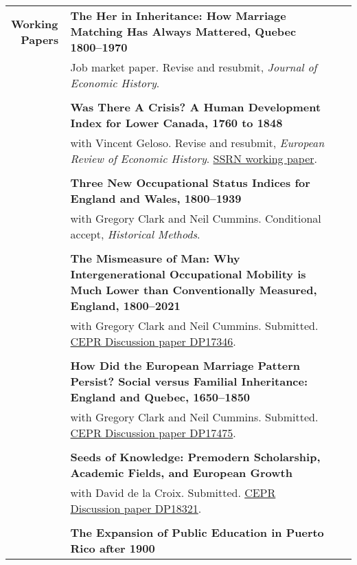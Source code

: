 \documentclass[a4paper,11pt,oneside]{article}
\begin{document}
\begin{longtable}{@{} p{0.175\linewidth} p{0.775\linewidth} p{0.05\linewidth}}
   \textbf{\large{Working \(\phantom{1}\)  Papers}}  & \textbf{The Her in Inheritance: How Marriage Matching Has Always Mattered, Quebec 1800--1970}\\ 
   &  Job market paper. Revise and resubmit, \emph{Journal of Economic History}. &  \\
   & &
   \\  
   &  \textbf{Was There A Crisis? A Human Development Index for Lower Canada, 1760 to 1848 } \\ 
   &   with Vincent Geloso. Revise and resubmit, \emph{European Review of Economic History}. \href{https://papers.ssrn.com/sol3/papers.cfm?abstract_id=4200516}{SSRN working paper}. &  \\
   \\
   & \textbf{Three New Occupational Status Indices for England and Wales, 1800--1939}\\ 
   &  with Gregory Clark and Neil Cummins. Conditional accept, \emph{Historical Methods}. &   \\
   \\
 
   & \textbf{The Mismeasure of Man: Why Intergenerational Occupational Mobility  is Much Lower than Conventionally Measured, England, 1800--2021}\\ 
   &  with Gregory Clark and Neil Cummins. Submitted. \href{https://hub.cepr.org/published-discussion-paper/139739}{CEPR Discussion paper DP17346}. &    \\
   & &
   \\  

   & \textbf{How Did the European Marriage Pattern Persist? Social versus Familial Inheritance: England and Quebec, 1650--1850 }\\ 
   &   with Gregory Clark and Neil Cummins. Submitted. \href{https://hub.cepr.org/published-discussion-paper/170950}{CEPR Discussion paper DP17475}. & \\
   \\
   & \textbf{Seeds of Knowledge: Premodern Scholarship, Academic Fields, and European Growth }\\ 
   &   with David de la Croix. Submitted. \href{https://cepr.org/publications/dp18321}{CEPR Discussion paper DP18321}. & \\
   
   \\
   
   & \textbf{The Expansion of Public Education in Puerto Rico after 1900} &\\
   

\end{longtable}
\end{document}
